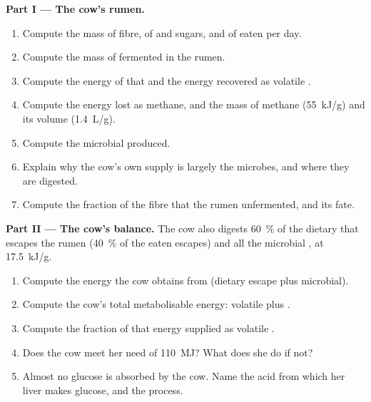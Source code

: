 \begin{problem}
\medskip
\noindent\textbf{Part I --- The cow's rumen.}
\begin{enumerate}
  \item Compute the mass of fibre, of  and sugars, and of
         eaten per day.
  \item Compute the mass of  fermented in the rumen.
  \item Compute the energy of that  and the energy
        recovered as volatile .
  \item Compute the energy lost as methane, and the mass of methane
        (\qty{55}{kJ/g}) and its volume (\qty{1.4}{L/g}).
  \item Compute the microbial  produced.
  \item Explain why the cow's own  supply is largely the
        microbes, and where they are digested.
  \item Compute the fraction of the fibre that  the rumen
        unfermented, and its fate.
\end{enumerate}

\medskip
\noindent\textbf{Part II --- The cow's balance.}
The cow also digests \qty{60}{\%} of the dietary  that escapes
the rumen (\qty{40}{\%} of the  eaten escapes) and all the
microbial , at \qty{17.5}{kJ/g}.
\begin{enumerate}[resume]
  \item Compute the energy the cow obtains from  (dietary
        escape plus microbial).
  \item Compute the cow's total metabolisable energy: volatile  plus .
  \item Compute the fraction of that energy supplied as volatile
        .
  \item Does the cow meet her need of \qty{110}{MJ}? What does she do
        if not?
  \item Almost no glucose is absorbed by the cow. Name the acid from
        which her liver makes glucose, and the process.
\end{enumerate}


\end{problem}

